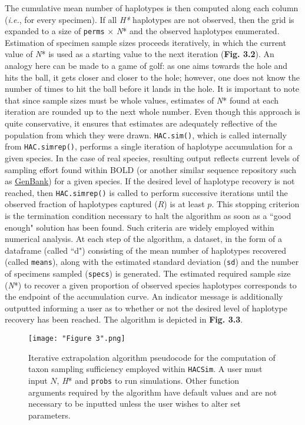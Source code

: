 \noindent The cumulative mean number of haplotypes is then computed along each column (\textit{i.e.}, for every specimen). If all \textit{H*} haplotypes are not observed, then the grid is expanded to a size of {\tt perms} $\times$ \textit{N}* and the observed haplotypes enumerated. Estimation of specimen sample sizes proceeds iteratively, in which the current value of \textit{N}* is used as a starting value to the next iteration (\textbf{Fig. 3.2}). An analogy here can be made to a game of golf: as one aims towards the hole and hits the ball, it gets closer and closer to the hole; however, one does not know the number of times to hit the ball before it lands in the hole. It is important to note that since sample sizes must be whole values, estimates of \textit{N}* found at each iteration are rounded up to the next whole number. Even though this approach is quite conservative, it ensures that estimates are adequately reflective of the population from which they were drawn. {\tt HAC.sim()}, which is called internally from {\tt HAC.simrep()}, performs a single iteration of haplotype accumulation for a given species. In the case of real species, resulting output reflects current levels of sampling effort found within BOLD (or another similar sequence repository such as \href{https://www.ncbi.nlm.nih.gov/genbank/}{GenBank}) for a given species. If the desired level of haplotype recovery is not reached, then {\tt HAC.simrep()} is called to perform successive iterations until the observed fraction of haplotypes captured ($R$) is at least $p$. This stopping criterion is the termination condition necessary to halt the algorithm as soon as a ``good enough" solution has been found. Such criteria are widely employed within numerical analysis. At each step of the algorithm, a dataset, in the form of a dataframe (called ``d") consisting of the mean number of haplotypes recovered (called {\tt means}), along with the estimated standard deviation ({\tt sd}) and the number of specimens sampled ({\tt specs}) is generated. The estimated required sample size (\textit{N}*) to recover a given proportion of observed species haplotypes corresponds to the endpoint of the accumulation curve. An indicator message is additionally outputted informing a user as to whether or not the desired level of haplotype recovery has been reached. The algorithm is depicted in \textbf{Fig. 3.3}. 


\begin{figure}[H]

\centering

\texttt{[image: "Figure 3".png]}

\caption{Iterative extrapolation algorithm pseudocode for the computation of taxon sampling sufficiency employed within {\tt HACSim}. A user must input $N$, \textit{H}* and {\tt probs} to run simulations. Other function arguments required by the algorithm have default values and are not necessary to be inputted unless the user wishes to alter set parameters.}

\end{figure}


